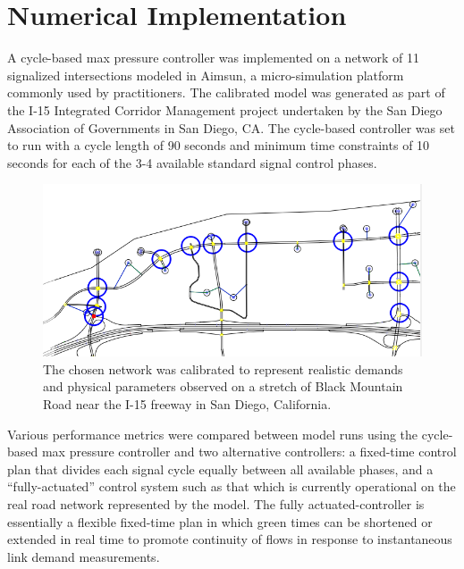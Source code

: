 \section{Numerical Implementation}
A cycle-based max pressure controller was implemented on a network of 11 signalized intersections modeled in Aimsun, a micro-simulation platform commonly used by practitioners. The calibrated model was generated as part of the I-15 Integrated Corridor Management project undertaken by the San Diego Association of Governments in San Diego, CA. 
The cycle-based controller was set to run with a cycle length of 90 seconds and minimum time constraints of 10 seconds for each of the 3-4 available standard signal control phases.  
\begin{figure}[h!]
\vspace{-1em}
\centering
\includegraphics[width=.8\columnwidth]{./i15network.png}
\caption{The chosen network was calibrated to represent realistic demands and physical parameters observed on a stretch of Black Mountain Road near the I-15 freeway in San Diego, California.}
\end{figure}

Various performance metrics were compared between model runs using the cycle-based max pressure controller and two alternative controllers: a fixed-time control plan that divides each signal cycle equally between all available phases, and a ``fully-actuated'' control system such as that which is currently operational on the real road network represented by the model. The fully actuated-controller is essentially a flexible fixed-time plan in which green times can be shortened or extended in real time to promote continuity of flows in response to instantaneous link demand measurements. 

